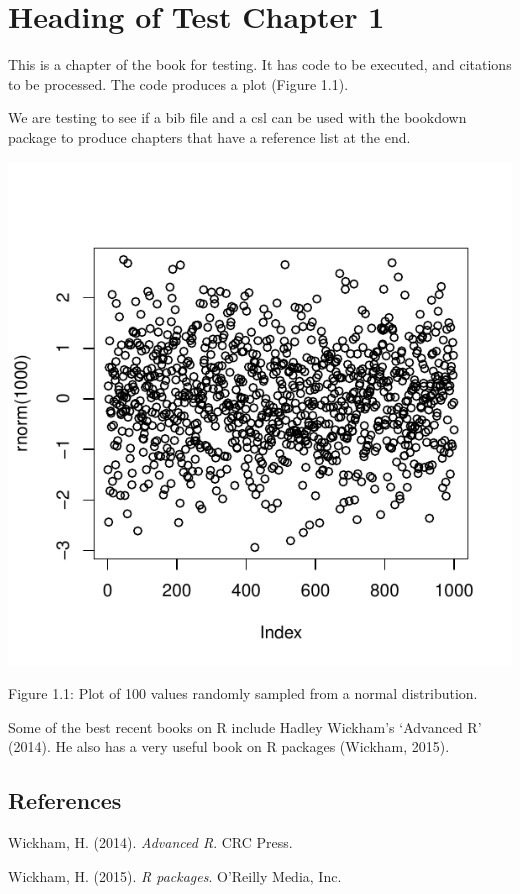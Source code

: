 \chapter{Heading of Test Chapter 1}\label{testchapterone}

This is a chapter of the book for testing. It has code to be executed,
and citations to be processed. The code produces a plot (Figure 1.1).

We are testing to see if a bib file and a csl can be used with the
bookdown package to produce chapters that have a reference list at the
end.

\begin{Shaded}
\begin{Highlighting}[]
\NormalTok{(}\NormalTok{(}\NormalTok{))}
\end{Highlighting}
\end{Shaded}

\includegraphics{figures/simple_plot-1.pdf}

Figure 1.1: Plot of 100 values randomly sampled from a normal
distribution.

Some of the best recent books on R include Hadley Wickham's `Advanced R'
(2014). He also has a very useful book on R packages (Wickham, 2015).

\section*{References}

Wickham, H. (2014). \emph{Advanced R}. CRC Press.

Wickham, H. (2015). \emph{R packages}. O'Reilly Media, Inc.
